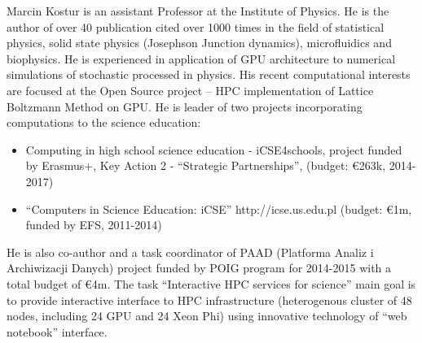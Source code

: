 \begin{participant}[type=leadPI,PM=12,salary=2000,gender=male]{Marcin Kostur}
is an assistant Professor at the Institute of Physics. He is the author of over 40
publication cited over 1000 times in the field of statistical physics,
solid state physics (Josephson Junction dynamics), microfluidics and
biophysics. He is experienced in application of GPU architecture to
numerical simulations of stochastic processed in physics. His recent
computational interests are focused at the Open Source project
 -- HPC implementation of Lattice Boltzmann Method on GPU.
He is leader of two projects incorporating computations to the science education:
\begin{itemize}
\item Computing in high school science education - iCSE4schools,
  project funded by Erasmus+, Key Action 2 - ``Strategic Partnerships'',
  (budget: \euro{263}k, 2014-2017)
\item ``Computers in Science Education: iCSE'' http://icse.us.edu.pl
  (budget: \euro{1}m, funded by EFS, 2011-2014)
\end{itemize}
He is also co-author and a task coordinator of PAAD (Platforma Analiz i
Archiwizacji Danych) project funded by POIG program for 2014-2015 with a total budget
of \euro{4}m. The task ``Interactive HPC services for science''
main goal is to provide interactive interface to HPC infrastructure
(heterogenous cluster of 48 nodes, including 24 GPU and 24 Xeon Phi)
using innovative technology of ``web notebook'' interface.  
\end{participant}
